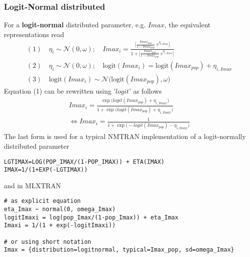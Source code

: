 \subsubsection{Logit-Normal distributed}
For a \textbf{logit-normal} distributed parameter, e.g. $Imax$, the equivalent representations read
\begin{align*}
&(1) \quad \eta_i \sim \mathcal{N}(0,\omega); \quad  Imax_i= \frac{\bigg[\frac{ Imax_{pop}}{1- Imax_{pop}} \; e^{\eta_{i, Imax}} \bigg]}{ 1+  \bigg[\frac{ Imax_{pop}}{1- Imax_{pop}} \; e^{\eta_{i, Imax}} \bigg]}   \\
&(2) \quad  \eta_i \sim \mathcal{N}(0,\omega); \quad \mbox{logit}(  Imax_i ) = \mbox{logit}(  Imax_{pop} ) + \eta_{i, Imax}  \\
&(3) \quad  \mbox{logit}(  Imax_i ) \sim \mathcal{N}\big( \mbox{logit}( Imax_{pop} ),\omega\big)
\end{align*}
Equation (1) can be rewritten using '$logit$' as follows
\begin{align*}
& Imax_i= \frac{\exp\big(logit(Imax_{pop})  + \eta_{i,Imax} \big)}{ 1+ \exp\big(logit(Imax_{pop}) + \eta_{i,Imax} \big)}  \\
& \Leftrightarrow  Imax_i= \frac{1}{ 1+ \exp\big(- logit(Imax_{pop}) - \eta_{i,Imax} \big)}
\end{align*}\newline
The last form is used for a typical NMTRAN implementation of a logit-normally distributed parameter
\begin{lstlisting}
LGTIMAX=LOG(POP_IMAX/(1-POP_IMAX)) + ETA(IMAX)
IMAX=1/(1+EXP(-LGTIMAX))
\end{lstlisting}
and in MLXTRAN
\begin{lstlisting}
# as explicit equation
eta_Imax ~ normal(0, omega_Imax)
logitImaxi = log(pop_Imax/(1-pop_Imax)) + eta_Imax
Imaxi = 1/(1 + exp(-logitImaxi))

# or using short notation
Imax = {distribution=logitnormal, typical=Imax_pop, sd=omega_Imax}
\end{lstlisting}



